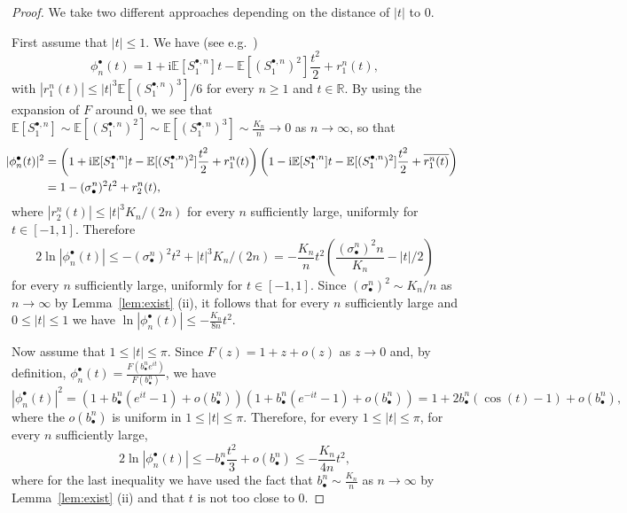 \documentclass[10pt]{amsart}
\theoremstyle{definition}\newtheorem{defi}[theo]{Definition}\newtheorem{rema}[theo]{Remark}\newtheorem{exam}[theo]{Example}\newtheorem{exem}[theo]{Example}\newtheorem{nota}[theo]{Notation}
\newcommand{\E}{\mathbb{E}}
\newcommand{\R}{\mathbb{R}}
\def\bbn{b_{\bullet}^{n}}
\def\sbn{\sigma_{\bullet}^{n}}
\def\Sbn{S^{\bullet,n}}
\def\phibn{\phi^{\bullet}_{n}}
\begin{document}
\begin{proof}
We take two different approaches depending on the distance of $|t|$ to $0$.

First assume that $|t| \leq 1$. We have (see e.g.~\cite[Lemma 3.3.7]{Dur10})
\[\phibn(t)=1+\textrm{i}\E[\Sbn_{1}]t- \E[(\Sbn_{1})^{2}] \frac{t^{2}}{2}+r^{n}_{1}(t),\]
with $|r^{n}_{1}(t)| \leq |t|^{3} \E[(\Sbn_{1})^{3}]/6$ for every $n \geq 1$ and $t \in \R$. By using the expansion of $F$ around $0$, we see that $ \E[\Sbn_{1}] \sim \E[(\Sbn_{1})^{2}] \sim \E[(\Sbn_{1})^{3}] \sim \frac{K_{n}}{n} \rightarrow 0$ as $n \rightarrow \infty$, so that
\begin{align*}
  \hspace{ -2mm} |\phibn(t)|^{2} &= \left( 1+\textrm{i}\E[\Sbn_{1}]t- \E[(\Sbn_{1})^{2}] \frac{t^{2}}{2}+r^{n}_{1}(t) \right) \left( 1-\textrm{i}\E[\Sbn_{1}]t- \E[(\Sbn_{1})^{2}] \frac{t^{2}}{2}+\overline{r^{n}_{1}(t)} \right)\\
&= 1 - (\sbn)^{2} t^{2}+r^{n}_{2}(t),
\end{align*}
where $|r^{n}_{2}(t)| \leq  |t|^{3} K_{n}/(2n)$ for every $n$ sufficiently large, uniformly for $t \in [-1,1]$.
Therefore
\[ 2 \ln |\phibn(t)| \leq - (\sbn)^{2} t^{2}+ |t|^{3} K_{n}/(2n)= - \frac{K_{n}}{n} t^{2} \left(  \frac{(\sbn)^{2} n}{K_{n}}-|t|/2 \right)
\]
for every $n$ sufficiently large, uniformly for $t \in [-1,1]$.
Since $(\sbn)^{2} \sim K_{n}/n$ as $n \rightarrow \infty$ by Lemma~\ref{lem:exist} (ii), it follows that for every $n$ sufficiently large and $0 \leq |t| \leq 1$ we have $ \ln | \phibn (t)| \leq -  \frac{K_{n}}{ 8n} t^{2}$.

Now assume that $1 \leq |t| \leq \pi$. Since $F(z)=1+z+o(z)$ as $z \rightarrow 0$ and, by definition, $\phibn(t)=\tfrac{F( \bbn e^{it})}{F(\bbn)}$,
we have
\[|\phibn(t)|^{2}=(1+\bbn(e^{it}-1)+o(\bbn))(1+\bbn(e^{-it}-1)+o(\bbn))=1+2\bbn(\cos(t)-1)+o(\bbn),\]
where the $o(\bbn)$ is uniform in $1\leq |t| \leq \pi$.
Therefore, for every $1 \leq |t| \leq \pi$, for every $n$ sufficiently large,
\[ 2 \ln |\phibn(t)| \leq - \bbn \frac{t^{2}}{3}+o(\bbn) \leq - \frac{K_{n}}{4n} t^{2},\]
where for the last inequality we have used the fact that $\bbn \sim \frac{K_{n}}{n}$ as $n \rightarrow \infty$ by Lemma~\ref{lem:exist} (ii) and that $t$ is not too close to $0$.
\end{proof}
\end{document}
